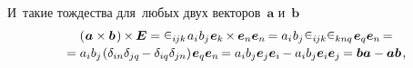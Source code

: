 \begin{otherlanguage}{russian}
И~такие тождества для~любых двух векторов~$\bm{a}$ и~$\bm{b}$
\nopagebreak\vspace{-0.2em}
\begin{multline}\label{vectorcrossvectorcrossidentity}
\left(\hspace{0.1ex} \bm{a} \times \bm{b} \hspace{0.2ex}\right) \hspace{-0.1ex} \times \hspace{-0.1ex} \bm{E}
= \levicivita_{i\hspace{-0.1ex}jk} \hspace{0.2ex} a_i \hspace{0.1ex} b_j \hspace{0.1ex} \bm{e}_k \hspace{-0.16ex} \times \hspace{-0.1ex} \bm{e}_n \bm{e}_n \hspace{-0.2ex}
= a_i \hspace{0.1ex} b_j \hspace{.1ex} \levicivita_{i\hspace{-0.1ex}jk} \levicivita_{knq} \hspace{.2ex} \bm{e}_q \bm{e}_n \hspace{-0.2ex} = \\[-0.1em]
%
= a_i b_j \hspace{-0.2ex} \left( \delta_{in} \delta_{jq} \hspace{-0.2ex} - \delta_{iq} \delta_{jn} \right) \hspace{-0.2ex} \bm{e}_q \bm{e}_n \hspace{-0.2ex}
= a_i b_j \bm{e}_j \bm{e}_i \hspace{-0.12ex} - a_i b_j \bm{e}_i \bm{e}_j \hspace{-0.16ex}
= \bm{b} \bm{a} - \bm{a} \bm{b} \hspace{0.2ex},
\end{multline}


\end{otherlanguage}
